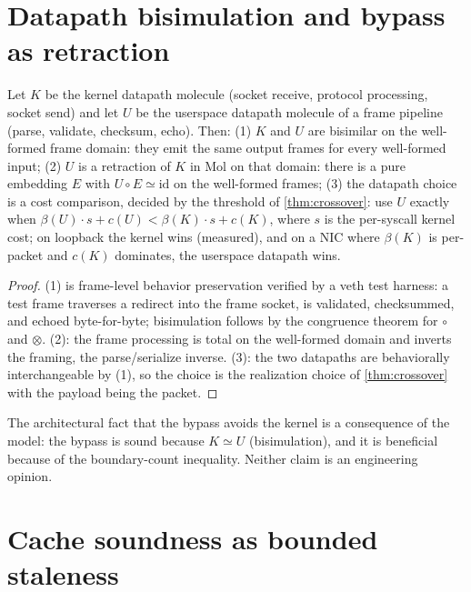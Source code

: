 \section{Datapath bisimulation and bypass as retraction}\label{sec:bypass}

\begin{theorem}\label{thm:bypass}
Let $K$ be the kernel datapath molecule (socket receive, protocol
processing, socket send) and let $U$ be the userspace datapath
molecule of a frame pipeline (parse, validate, checksum, echo). Then:
(1) $K$ and $U$ are bisimilar on the well-formed frame domain: they
emit the same output frames for every well-formed input;
(2) $U$ is a retraction of $K$ in Mol on that domain: there is a pure
embedding $E$ with $U \circ E \simeq \mathrm{id}$ on the well-formed
frames;
(3) the datapath choice is a cost comparison, decided by the threshold
of \autoref{thm:crossover}: use $U$ exactly when
$\beta (U) \cdot s + c (U) < \beta (K) \cdot s + c (K)$, where $s$ is the
per-syscall kernel cost; on loopback the kernel wins (measured), and on
a NIC where $\beta (K)$ is per-packet and $c (K)$ dominates, the
userspace datapath wins.
\end{theorem}

\begin{proof}
(1) is frame-level behavior preservation verified by a veth test
harness: a test frame traverses a redirect into the frame socket, is
validated, checksummed, and echoed byte-for-byte; bisimulation follows
by the congruence theorem for $\circ$ and $\otimes$. (2): the frame
processing is total on the well-formed domain and inverts the framing,
the parse/serialize inverse. (3): the two datapaths are behaviorally
interchangeable by (1), so the choice is the realization choice of
\autoref{thm:crossover} with the payload being the packet.
\end{proof}

\begin{remark}
The architectural fact that the bypass avoids the kernel is a
consequence of the model: the bypass is sound because $K \simeq U$
(bisimulation), and it is beneficial because of the boundary-count
inequality. Neither claim is an engineering opinion.
\end{remark}

\section{Cache soundness as bounded staleness}\label{sec:cache}

